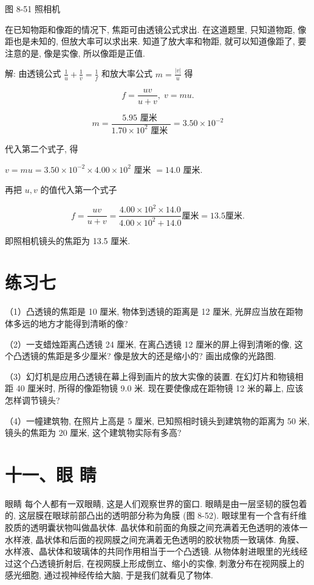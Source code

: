 \documentclass[10pt]{article}
\begin{document}
图 8-51 照相机

在已知物距和像距的情况下, 焦距可由透镜公式求出. 在这道题里, 只知道物距, 像距也是未知的, 但放大率可以求出来. 知道了放大率和物距, 就可以知道像距了, 要注意的是, 像是实像, 所以像距是正值.

解: 由透镜公式 \(\frac{1}{u} + \frac{1}{v} = \frac{1}{f}\) 和放大率公式 \(m = \frac{\left| v\right| }{u}\) 得

\[
f = \frac{uv}{u + v},\;v = {mu}.
\]

\[
m = \frac{{5.95}\text{ 厘米 }}{{1.70} \times {10}^{2}\text{ 厘米 }} = {3.50} \times {10}^{-2}
\]

代入第二个式子, 得

\(v = {mu} = {3.50} \times {10}^{-2} \times {4.00} \times {10}^{2}\) 厘米 \(= {14.0}\) 厘米.

再把 \(u,v\) 的值代入第一个式子

\[
f = \frac{uv}{u + v} = \frac{{4.00} \times {10}^{2} \times {14.0}}{{4.00} \times {10}^{2} + {14.0}}\text{厘米} = {13.5}\text{厘米.}
\]

即照相机镜头的焦距为 13.5 厘米.

\section*{练习七}

（1）凸透镜的焦距是 10 厘米, 物体到透镜的距离是 12 厘米, 光屏应当放在距物体多远的地方才能得到清晰的像?

（2）一支蜡烛距离凸透镜 24 厘米, 在离凸透镜 12 厘米的屏上得到清晰的像, 这个凸透镜的焦距是多少厘米? 像是放大的还是缩小的? 画出成像的光路图.

（3）幻灯机是应用凸透镜在幕上得到画片的放大实像的装置. 在幻灯片和物镜相距 40 厘米时, 所得的像距物镜 9.0 米. 现在要使像成在距物镜 12 米的幕上, 应该怎样调节镜头?

（4）一幢建筑物, 在照片上高是 5 厘米, 已知照相时镜头到建筑物的距离为 50 米, 镜头的焦距为 20 厘米, 这个建筑物实际有多高?

\section*{十一、眼 睛}

眼睛 每个人都有一双眼睛, 这是人们观察世界的窗口. 眼睛是由一层坚韧的膜包着的, 这层膜在眼球前部凸出的透明部分称为角膜 (图 8-52). 眼球里有一个含有纤维胶质的透明囊状物叫做晶状体. 晶状体和前面的角膜之间充满着无色透明的液体一水样液, 晶状体和后面的视网膜之间充满着无色透明的胶状物质一致璃体. 角膜、水样液、晶状体和玻璃体的共同作用相当于一个凸透镜. 从物体射进眼里的光线经过这个凸透镜折射后, 在视网膜上形成倒立、缩小的实像, 刺激分布在视网膜上的感光细胞, 通过视神经传给大脑, 于是我们就看见了物体.
\end{document}

